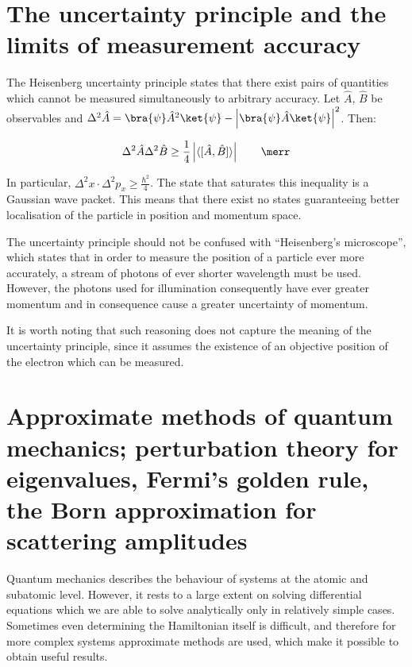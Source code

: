 \section{The uncertainty principle and the limits of measurement accuracy}

The Heisenberg uncertainty principle states that there exist pairs of quantities which cannot be measured simultaneously to arbitrary accuracy. Let $\hat{A}$, $\hat{B}$ be observables and $\Delta^2 \hat{A} = \bra{\psi}\hat{A}^2\ket{\psi} - \left|\bra{\psi}\hat{A}\ket{\psi}\right|^2$. Then:

\begin{equation}
    \Delta^2 \hat{A} \Delta^2 \hat{B} \geq \frac{1}{4}\left| \langle [\hat{A},\hat{B}] \rangle  \right| \qquad \merr
\end{equation}

In particular, $\Delta^2 x \cdot \Delta^2 p_x \geq \frac{\hbar^2}{4}$. The state that saturates this inequality is a Gaussian wave packet. This means that there exist no states guaranteeing better localisation of the particle in position and momentum space.

The uncertainty principle should not be confused with ``Heisenberg's microscope'', which states that in order to measure the position of a particle ever more accurately, a stream of photons of ever shorter wavelength must be used. However, the photons used for illumination consequently have ever greater momentum and in consequence cause a greater uncertainty of momentum.

It is worth noting that such reasoning does not capture the meaning of the uncertainty principle, since it assumes the existence of an objective position of the electron which can be measured.

\section{Approximate methods of quantum mechanics; perturbation theory for eigenvalues, Fermi's golden rule, the Born approximation for scattering amplitudes}

Quantum mechanics describes the behaviour of systems at the atomic and subatomic level. However, it rests to a large extent on solving differential equations which we are able to solve analytically only in relatively simple cases. Sometimes even determining the Hamiltonian itself is difficult, and therefore for more complex systems approximate methods are used, which make it possible to obtain useful results.

